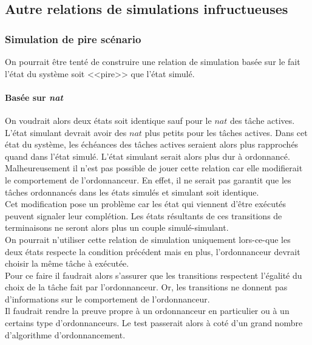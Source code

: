 \documentclass[11pt,a4paper,oneside]{book}
\theoremstyle{break}
\theoremstyle{breakplain}
\begin{document}
\subsection{Autre relations de simulations infructueuses}

\subsubsection{Simulation de pire scénario}

On pourrait être tenté de construire une relation de simulation basée sur le fait l'état du système soit <<pire>> que l'état simulé.

\paragraph{Basée sur \textit{nat}}
On voudrait alors deux états soit identique sauf pour le $nat$ des tâche actives. L'état simulant devrait avoir des $nat$ plus petits pour les tâches actives. Dans cet état du système, les échéances des tâches actives seraient alors plus rapprochés quand dans l'état simulé. L'état simulant serait alors plus dur à ordonnancé.\\

Malheureusement il n'est pas possible de jouer cette relation car elle modifierait le comportement de l'ordonnanceur. En effet, il ne serait pas garantit que les tâches ordonnancés dans les états simulés et simulant soit identique.\\
Cet modification pose un problème car les état qui viennent d'être exécutés peuvent signaler leur complétion. Les états résultants de ces transitions de terminaisons ne seront alors plus un couple simulé-simulant.\\

On pourrait n'utiliser cette relation de simulation uniquement lors-ce-que les deux états respecte la condition précédent mais en plus, l'ordonnanceur devrait choisir la même tâche à exécutée.\\
Pour ce faire il faudrait alors s'assurer que les transitions respectent l'égalité du choix de la tâche fait par l'ordonnanceur. Or, les transitions ne donnent pas d'informations sur le comportement de l'ordonnanceur.\\
Il faudrait rendre la preuve propre à un ordonnanceur en particulier ou à un certains type d'ordonnanceurs. Le test passerait alors à coté d'un grand nombre d'algorithme d'ordonnancement.\\
\end{document}
